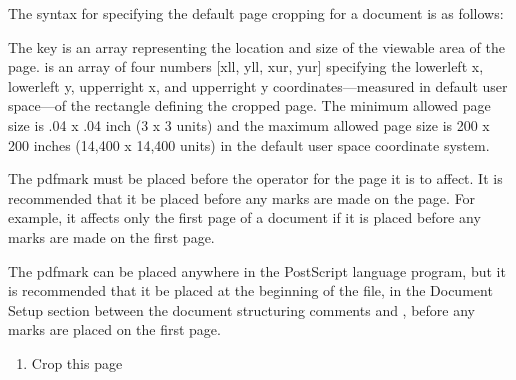 \documentclass[letterpaper,12pt,english,openany,oneside]{sphinxmanual}
\begin{document}
The syntax for specifying the default page cropping for a document is as follows:

\begin{sphinxVerbatim}[commandchars=\\\{\}]
 \PYG{p}{[}  \PYG{p}{[}
   
\PYG{p}{]}

  
\end{sphinxVerbatim}

The  key is an array representing the location and size of the viewable area of the page.  is an array of four numbers {[}xll, yll, xur, yur{]} specifying the lower\sphinxhyphen{}left x, lower\sphinxhyphen{}left y, upper\sphinxhyphen{}right x, and upper\sphinxhyphen{}right y coordinates—measured in default user space—of the rectangle defining the cropped page. The minimum allowed page size is .04 x .04 inch (3 x 3 units) and the maximum allowed page size is 200 x 200 inches (14,400 x 14,400 units) in the default user space coordinate system.

The  pdfmark must be placed before the  operator for the page it is to affect. It is recommended that it be placed before any marks are made on the page. For example, it affects only the first page of a document if it is placed before any marks are made on the first page.

The  pdfmark can be placed anywhere in the PostScript language program, but it is recommended that it be placed at the beginning of the file, in the Document Setup section between the document structuring comments  and  , before any marks are placed on the first page.
\begin{enumerate}
%
\item {} 
Crop this page

\end{enumerate}
\end{document}
